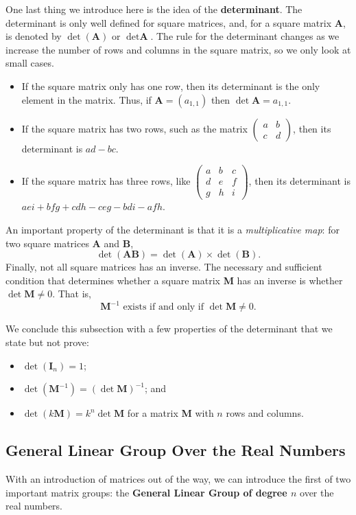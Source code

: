 One last thing we introduce here is the idea of the \textbf{determinant}. The determinant is only well defined for square matrices, and, for a square matrix $\textbf{A}$, is denoted by $\det(\textbf{A})$ or $\det \textbf{A}$. The rule for the determinant changes as we increase the number of rows and columns in the square matrix, so we only look at small cases.
\begin{itemize}
    \item If the square matrix only has one row, then its determinant is the only element in the matrix. Thus, if $\textbf{A} = (a_{1,1})$ then $\det \textbf{A} = a_{1,1}$.
    \item If the square matrix has two rows, such as the matrix $\begin{pmatrix}a & b\\c & d\end{pmatrix}$, then its determinant is $ad-bc$.
    \item If the square matrix has three rows, like $\begin{pmatrix}a & b & c \\ d & e & f \\ g & h & i\end{pmatrix}$, then its determinant is $aei+bfg+cdh-ceg-bdi-afh$.
\end{itemize}
An important property of the determinant is that it is a \textit{multiplicative map}: for two square matrices \textbf{A} and \textbf{B},
\[
    \det (\textbf{AB}) = \det(\textbf{A}) \times \det(\textbf{B}).
\]
Finally, not all square matrices has an inverse. The necessary and sufficient condition that determines whether a square matrix \textbf{M} has an inverse is whether $\det \textbf{M} \neq 0$. That is,
\[
    \textbf{M}^{-1} \text{ exists if and only if } \det \textbf{M} \neq 0.
\]

We conclude this subsection with a few properties of the determinant that we state but not prove:
\begin{itemize}
    \item $\det(\textbf{I}_n) = 1$;
    \item $\det(\textbf{M}^{-1}) = \left(\det \textbf{M}\right)^{-1}$; and
    \item $\det(k\textbf{M}) = k^n \det\textbf{M}$ for a matrix \textbf{M} with $n$ rows and columns.
\end{itemize}

\subsection{General Linear Group Over the Real Numbers}\label{subsection-GLR-matrix-group}
With an introduction of matrices out of the way, we can introduce the first of two important matrix groups: the \textbf{General Linear Group of degree $n$} over the real numbers.


